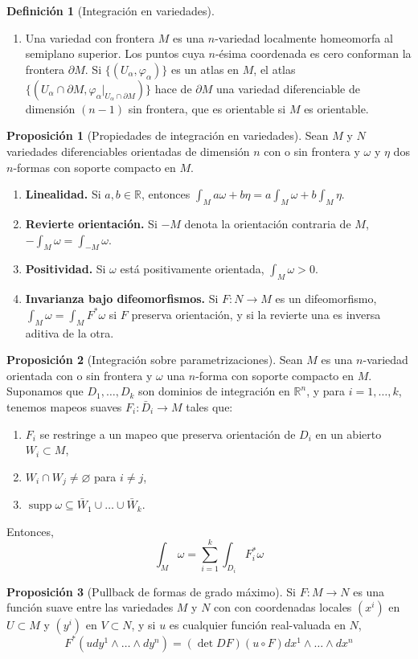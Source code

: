 \documentclass[spanish]{article}
\theoremstyle{definition}
\newtheorem*{defn}{Definición}
\newtheorem*{prop}{Proposición}
\newcommand{\R}{\mathbb{R}}
\DeclareMathOperator{\supp}{supp}
\begin{document}
\begin{defn}[Integración en variedades]
\begin{enumerate}
			\item Una variedad con frontera $M$ es una $n$-variedad localmente homeomorfa al semiplano superior. Los puntos cuya $n$-ésima coordenada es cero conforman la frontera $\partial M$. Si $\{(U_\alpha,\varphi_\alpha)\}$ es un atlas en $M$, el atlas $\{(U_\alpha\cap\partial M,\varphi_{\alpha}|_{U_\alpha\cap\partial M})\}$ hace de $\partial M$ una variedad diferenciable de dimensión $(n-1)$ sin frontera, que es orientable si $M$ es orientable.
		\end{enumerate}
	\end{defn}
	
	\begin{prop}[Propiedades de integración en variedades]
		Sean $M$ y $N$ variedades diferenciables orientadas de dimensión $n$ con o sin frontera y $\omega$ y $\eta$ dos $n$-formas con soporte compacto en $M$.
		\begin{enumerate}
			\item \textbf{Linealidad.} Si $a,b\in\R$, entonces $\int_Ma\omega+b\eta=a\int_M\omega+b\int_M\eta$.
			
			\item \textbf{Revierte orientación.} Si $-M$ denota la orientación contraria de $M$, $-\int_M\omega=\int_{-M}\omega$.
			
			\item \textbf{Positividad.} Si $\omega$ está positivamente orientada, $\int_M\omega>0$.
			
			\item \textbf{Invarianza bajo difeomorfismos.} Si $F:N\to M$ es un difeomorfismo, $\int_M\omega=\int_M F^*\omega$ si $F$ preserva orientación, y si la revierte una es inversa aditiva de la otra.
		\end{enumerate}
	\end{prop}
	\begin{prop}[Integración sobre parametrizaciones]
		Sean $M$ es una $n$-variedad orientada con o sin frontera y $\omega$ una $n$-forma con soporte compacto en $M$. Suponamos que $D_1,\ldots,D_k$ son dominios de integración en $\R^n$, y para $i=1,\ldots,k$, tenemos mapeos suaves $F_i:\bar{D}_i\to M$ tales que:
		\begin{enumerate}
			\item $F_i$ se restringe a un mapeo que preserva orientación de $D_i$ en un abierto $W_i\subset M$,
			\item $W_i\cap W_j\neq\varnothing$ para $i\neq j$,
			\item $\supp \omega\subseteq\bar{W}_1\cup\ldots\cup\bar{W}_k$.
		\end{enumerate}
		Entonces,
		\[\int_M\omega=\sum_{i=1}^k\int_{D_i}F^*_i\omega\]
	\end{prop}
	\begin{prop}[Pullback de formas de grado máximo]
		Si $F:M\to N$ es una función suave entre las variedades $M$ y $N$ con con coordenadas locales $(x^i)$ en $U\subset M$ y $(y^i)$ en $V\subset N$, y si $u$ es cualquier función real-valuada en $N$,
		\[F^*(udy^1\wedge\ldots\wedge dy^n)=(\det DF)(u\circ F)dx^1\wedge\ldots\wedge dx^n\]
	\end{prop}
	
\end{document}
